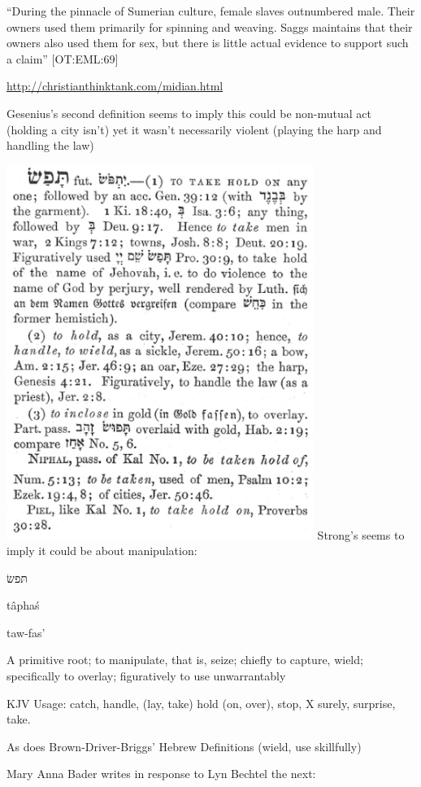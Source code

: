 \documentclass[11pt]{article}
\begin{document}
“During the pinnacle of Sumerian culture, female slaves outnumbered male. Their owners used them primarily for spinning and weaving. Saggs maintains that their owners also used them for sex, but there is little actual evidence to support such a claim” [OT:EML:69]

\url{http://christianthinktank.com/midian.html}


Gesenius’s second definition seems to imply this could be non-mutual act (holding a city isn’t) yet it wasn’t necessarily violent (playing the harp and handling the law)

\includegraphics[width=10cm]{taphas}
Strong’s seems to imply it could be about manipulation:

 \begin{hebrew} תּפשׂ  \end{hebrew}

tâphaś 

taw-fas' 

A primitive root; to manipulate, that is, seize; chiefly to capture, wield; specifically to overlay; figuratively to use unwarrantably

KJV Usage: catch, handle, (lay, take) hold (on, over), stop, X surely, surprise, take.


As does Brown-Driver-Briggs' Hebrew Definitions (wield, use skillfully)


Mary Anna Bader writes in response to Lyn Bechtel the next:
\end{document}
